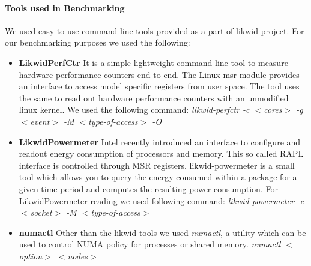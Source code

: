 \paragraph{Tools used in Benchmarking}
We used easy to use command line tools provided as a part of likwid
project. For our benchmarking purposes we used the following:
\begin{itemize}[leftmargin=*]
\item \textbf{LikwidPerfCtr}
It is a simple lightweight command line tool to measure hardware
performance counters end to end. The Linux msr module provides an
interface to access model specific registers from user space.  The
tool uses the same to read out hardware performance counters with an
unmodified linux kernel. We used the following command:\newline
\emph{likwid-perfctr -c $<$cores$>$ -g $<$event$>$ -M $<$type-of-access$>$ -O}
\item \textbf{LikwidPowermeter}
Intel recently introduced an interface to configure and readout energy
consumption of processors and memory. This so called RAPL interface is
controlled through MSR registers. likwid-powermeter is a small tool
which allows you to query the energy consumed within a package for a
given time period and computes the resulting power consumption. For
LikwidPowermeter reading we used following command:\newline
\emph{likwid-powermeter -c $<$socket$>$ -M $<$type-of-access$>$}\newline
\item \textbf{numactl}
Other than the likwid tools we used \emph{numactl}, a utility which
can be used to control NUMA policy for processes or shared memory.
\emph{numactl $<$option$>$ $<$nodes$>$}
\end{itemize}

